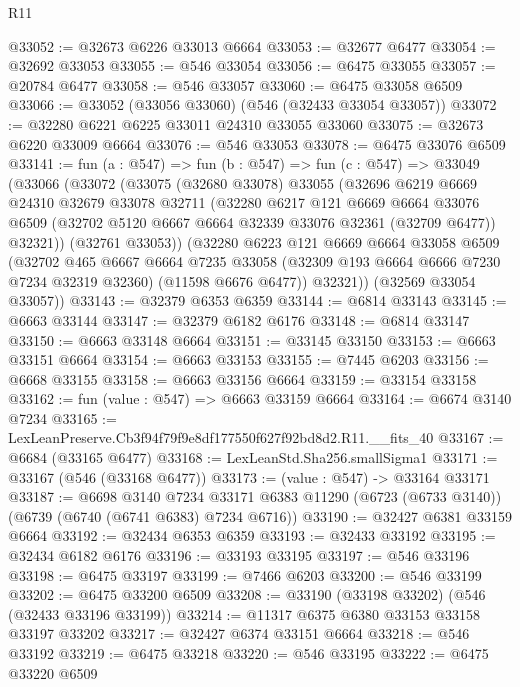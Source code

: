 \begin{lexlean}{R11}
\begin{coremodule}
@33052 := @32673 @6226 @33013 @6664
@33053 := @32677 @6477
@33054 := @32692 @33053
@33055 := @546 @33054
@33056 := @6475 @33055
@33057 := @20784 @6477
@33058 := @546 @33057
@33060 := @6475 @33058 @6509
@33066 := @33052 (@33056 @33060) (@546 (@32433 @33054 @33057))
@33072 := @32280 @6221 @6225 @33011 @24310 @33055 @33060
@33075 := @32673 @6220 @33009 @6664
@33076 := @546 @33053
@33078 := @6475 @33076 @6509
@33141 := fun (a : @547) =>
  fun (b : @547) =>
  fun (c : @547) =>
  @33049
    (@33066
      (@33072
        (@33075
          (@32680 @33078)
          @33055
          (@32696
            @6219
            @6669
            @24310
            @32679
            @33078
            @32711
            (@32280
              @6217
              @121
              @6669
              @6664
              @33076
              @6509
              (@32702 @5120 @6667 @6664 @32339 @33076 @32361 (@32709 @6477))
              @32321))
          (@32761 @33053))
        (@32280
          @6223
          @121
          @6669
          @6664
          @33058
          @6509
          (@32702
            @465
            @6667
            @6664
            @7235
            @33058
            (@32309 @193 @6664 @6666 @7230 @7234 @32319 @32360)
            (@11598 @6676 @6477))
          @32321))
      (@32569 @33054 @33057))
@33143 := @32379 @6353 @6359
@33144 := @6814 @33143
@33145 := @6663 @33144
@33147 := @32379 @6182 @6176
@33148 := @6814 @33147
@33150 := @6663 @33148 @6664
@33151 := @33145 @33150
@33153 := @6663 @33151 @6664
@33154 := @6663 @33153
@33155 := @7445 @6203
@33156 := @6668 @33155
@33158 := @6663 @33156 @6664
@33159 := @33154 @33158
@33162 := fun (value : @547) => @6663 @33159 @6664
@33164 := @6674 @3140 @7234
@33165 := LexLeanPreserve.Cb3f94f79f9e8df177550f627f92bd8d2.R11.__fits_40
@33167 := @6684 (@33165 @6477)
@33168 := LexLeanStd.Sha256.smallSigma1
@33171 := @33167 (@546 (@33168 @6477))
@33173 := (value : @547) -> @33164 @33171
@33187 := @6698
    @3140
    @7234
    @33171
    @6383
    @11290
    (@6723 (@6733 @3140))
    (@6739 (@6740 (@6741 @6383) @7234 @6716))
@33190 := @32427 @6381 @33159 @6664
@33192 := @32434 @6353 @6359
@33193 := @32433 @33192
@33195 := @32434 @6182 @6176
@33196 := @33193 @33195
@33197 := @546 @33196
@33198 := @6475 @33197
@33199 := @7466 @6203
@33200 := @546 @33199
@33202 := @6475 @33200 @6509
@33208 := @33190 (@33198 @33202) (@546 (@32433 @33196 @33199))
@33214 := @11317 @6375 @6380 @33153 @33158 @33197 @33202
@33217 := @32427 @6374 @33151 @6664
@33218 := @546 @33192
@33219 := @6475 @33218
@33220 := @546 @33195
@33222 := @6475 @33220 @6509

\end{coremodule}
\end{lexlean}
